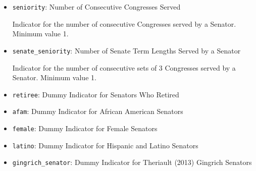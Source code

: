 \documentclass[12pt]{article}
\begin{document}
\begin{itemize}
	\item \verb|seniority|: Number of Consecutive Congresses Served
	
	Indicator for the number of consecutive Congresses served by a Senator. Minimum value 1.
	
	\item \verb|senate_seniority|: Number of Senate Term Lengths Served by a Senator 
		
	Indicator for the number of consecutive sets of 3 Congresses served by a Senator. Minimum value 1.
	
	\item \verb|retiree|: Dummy Indicator for Senators Who Retired
	
	\item \verb|afam|: Dummy Indicator for African American Senators
	
	\item \verb|female|: Dummy Indicator for Female Senators
	
	\item \verb|latino|: Dummy Indicator for Hispanic and Latino Senators
	
	\item \verb|gingrich_senator|: Dummy Indicator for Theriault (2013) Gingrich Senators
\end{itemize}
\end{document}
